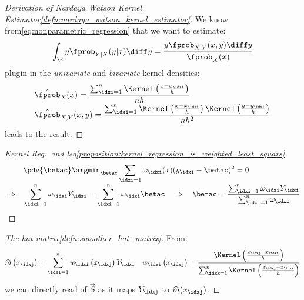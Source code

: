 \begin{proofbox}\nospacing
    \begin{proof}[Derivation of Nardaya Watson Kernel Estimator\cref{defn:nardaya_watson_kernel_estimator}]\label{proof:defn:nardaya_watson_kernel_estimator}
        We know from\cref{eq:nonparametric_regression} that we want to estimate:
        \begin{align*}
          \int_{\R}y\fprob_{Y|X}(y|x)\diff y=\frac{y\fprob_{X,Y}(x,y)\diff y}{\fprob_{X}(x)}
        \end{align*}
        plugin in the \textit{univariate} and \textit{bivariate} kernel densities:
        \begin{align*}
          &\hat{\fprob}_{X}(x)=\frac{\sum_{\idxi=1}^{n}\Kernel \left(\frac{x-x_{\idxi}}{h}\right)}{nh}\\[-1\jot]
          &\hat{\fprob}_{X,Y}(x,y)=\frac{\sum_{\idxi=1}^{n}\Kernel \left(\frac{x-x_{\idxi}}{h}\right)\Kernel \left(\frac{y-y_{\idxi}}{h}\right)}{nh^{2}}
        \end{align*}
        leads to the result.
    \end{proof}
\end{proofbox}
\begin{proofbox}\nospacing
    \begin{proof}[Kernel Reg.\ and lsq\cref{proposition:kernel_regression_is_weighted_least_squars}]
        \label{proof:proposition:kernel_regression_is_weighted_least_squars}
        \begin{align*}
          &&&\pdv{\betac}\argmin_{\betac}\sum_{\idxi=1}\omega_{\idxi}(x)(y_{\idxi}-\betac)^{2}=0 \\[-1\jot]
          &\Rightarrow&&\sum_{\idxi=1}^{n}\omega_{\idxi}Y_{\idxi}=\sum_{\idxi=1}^{n}\omega_{\idxi}\betac
          \quad\Rightarrow\quad\betac=\frac{\sum_{\idxi=1}^{n}\omega_{\idxi}Y_{\idxi}}{\sum_{\idxi=1}^{n}\omega_{\idxi}}
        \end{align*}
    \end{proof}
\end{proofbox}
\begin{proofbox}\nospacing
    \begin{proof}[The hat matrix\cref{defn:smoother_hat_matrix}]\label{proof:defn:smoother_hat_matrix}
        From:
        \begin{align}
          \widehat{m}\left(x_{\idxj}\right)
          =\sum_{\idxi=1}^{n}w_{\idxi}\left(x_{\idxj}\right)Y_{\idxi}&&
          w_{\idxi}\left(x_{\idxj}\right)=\frac{\Kernel \left(\frac{x_{\idxj}-x_{\idxi}}{h}\right)}{\sum_{\idxk=1}^{n}\Kernel \left(\frac{x_{\idxj}-x_{\idxk}}{h}\right)}
        \end{align}
        we can directly read of $\vec{S}$ as it maps $Y_{\idxj}$ to $\widehat{m}(x_{\idxj})$.
    \end{proof}
\end{proofbox}
